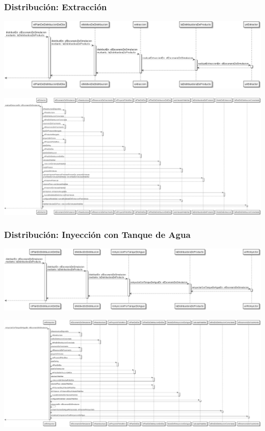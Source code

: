 \documentclass[10pt,a3paper, ,landscape]{article}
\begin{document}
\pagebreak

\subsubsection{Distribución: Extracción}

\centerline{\includegraphics[scale=0.5]{images/secuenciaDistribucionMotivo1.png}}
\vspace{0.25cm}
\centerline{\includegraphics[scale=0.45]{images/secuenciaDistribucionMotivo2.png}}

\pagebreak

\subsubsection{Distribución: Inyección con Tanque de Agua}

\centerline{\includegraphics[scale=0.6]{images/secuenciaDistribucionMotivoAgua1.png}}
\vspace{0.5cm}
\centerline{\includegraphics[scale=0.5]{images/secuenciaDistribucionMotivoAgua2.png}}
\end{document}
